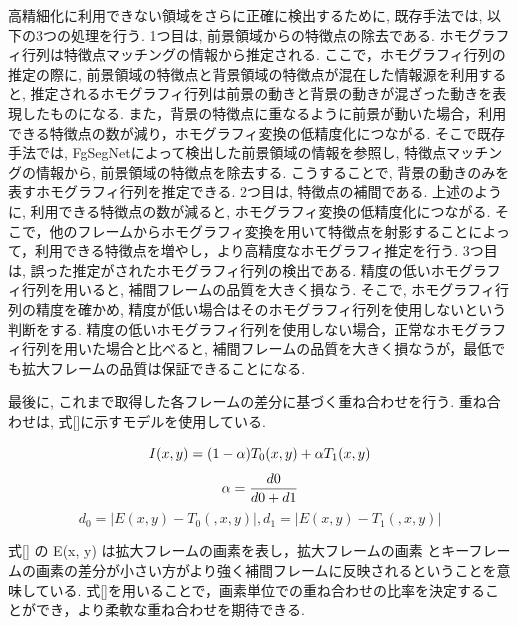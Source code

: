 \documentclass[a4paper,12pt]{jsreport}
\begin{document}
高精細化に利用できない領域をさらに正確に検出するために, 既存手法では, 以下の3つの処理を行う. 
1つ目は, 前景領域からの特徴点の除去である. ホモグラフィ行列は特徴点マッチングの情報から推定される. ここで，ホモグラフィ行列の推定の際に, 前景領域の特徴点と背景領域の特徴点が混在した情報源を利用すると, 推定されるホモグラフィ行列は前景の動きと背景の動きが混ざった動きを表現したものになる. また，背景の特徴点に重なるように前景が動いた場合，利用できる特徴点の数が減り，ホモグラフィ変換の低精度化につながる. そこで既存手法では, FgSegNetによって検出した前景領域の情報を参照し,  特徴点マッチングの情報から, 前景領域の特徴点を除去する. こうすることで, 背景の動きのみを表すホモグラフィ行列を推定できる.
2つ目は, 特徴点の補間である. 上述のように, 利用できる特徴点の数が減ると, ホモグラフィ変換の低精度化につながる. そこで，他のフレームからホモグラフィ変換を用いて特徴点を射影することによって，利用できる特徴点を増やし，より高精度なホモグラフィ推定を行う. 
3つ目は, 誤った推定がされたホモグラフィ行列の検出である. 精度の低いホモグラフィ行列を用いると, 補間フレームの品質を大きく損なう. そこで, ホモグラフィ行列の精度を確かめ, 精度が低い場合はそのホモグラフィ行列を使用しないという判断をする. 精度の低いホモグラフィ行列を使用しない場合，正常なホモグラフィ行列を用いた場合と比べると, 補間フレームの品質を大きく損なうが，最低でも拡大フレームの品質は保証できることになる.

最後に, これまで取得した各フレームの差分に基づく重ね合わせを行う. 
重ね合わせは, 式[]に示すモデルを使用している. 

\begin{equation}
 I(x,y) = (1 - \alpha)T_0(x,y)+\alpha T_1(x,y)\\ 
\end{equation}
$$ \alpha = \frac{d0}{d0+d1} \\ $$
$$ d_0 = |E(x,y) - T_0(,x,y)|, d_1 = |E(x,y) - T_1(,x,y)| $$

式[] の E(x, y) は拡大フレームの画素を表し，拡大フレームの画素 とキーフレームの画素の差分が小さい方がより強く補間フレームに反映されるということを意味している. 式[]を用いることで，画素単位での重ね合わせの比率を決定することができ，より柔軟な重ね合わせを期待できる.
\end{document}
